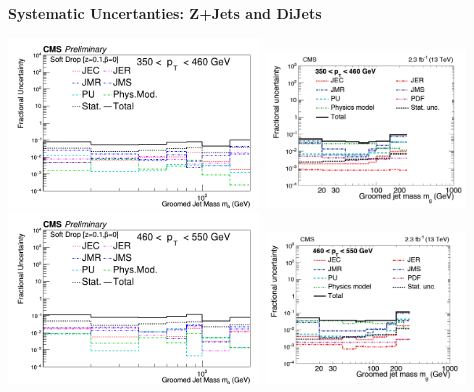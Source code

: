 \documentclass{beamer}
\begin{document}
\begin{frame}{\textbf{Systematic Uncertanties: Z+Jets and DiJets}}


\includegraphics[width=0.5\textwidth]{Oct31_unfoldPlots_sdB0/AllSystematics_FractionofUnfoldedBinContent_ptbin4MC_mass_Ptbin350to460_Detbinning_Groomingis_sdB0.png}%
\includegraphics[width=0.4\textwidth]{dijet350.png}
\newline
\includegraphics[width=0.5\textwidth]{Oct31_unfoldPlots_sdB0/AllSystematics_FractionofUnfoldedBinContent_ptbin5MC_mass_Ptbin460to550_Detbinning_Groomingis_sdB0.png}%
\includegraphics[width=0.4\textwidth]{dijet460.png}



\end{frame}
\end{document}
